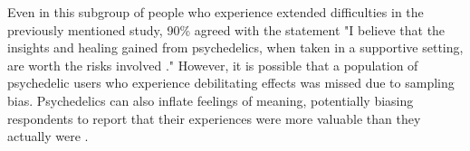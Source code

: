 \documentclass[12pt,letterpaper]{book}
\begin{document}
Even in this subgroup of people who experience extended difficulties in the previously mentioned study, 90\% agreed with the statement "I believe that the insights and healing gained from psychedelics, when taken in a supportive setting, are worth the risks involved \cite{evans2023extended}." However, it is possible that a population of psychedelic users who experience debilitating effects was missed due to sampling bias. Psychedelics can also inflate feelings of meaning, potentially biasing respondents to report that their experiences were more valuable than they actually were \cite{hartogsohn2018meaning}.%
\end{document}
